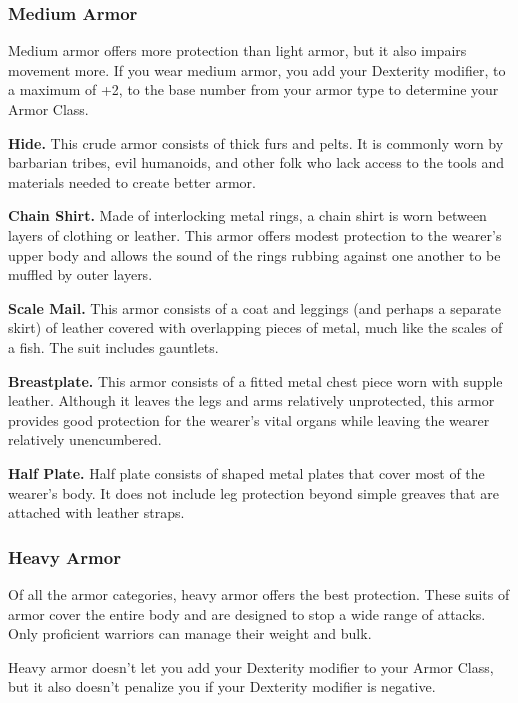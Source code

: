 \documentclass[
]{article}
\begin{document}
\hypertarget{medium-armor}{%
\subsubsection{Medium Armor}\label{medium-armor}}

Medium armor offers more protection than light armor, but it also
impairs movement more. If you wear medium armor, you add your Dexterity
modifier, to a maximum of +2, to the base number from your armor type to
determine your Armor Class.

\textbf{Hide.} This crude armor consists of thick furs and pelts. It is
commonly worn by barbarian tribes, evil humanoids, and other folk who
lack access to the tools and materials needed to create better armor.

\textbf{Chain Shirt.} Made of interlocking metal rings, a chain shirt is
worn between layers of clothing or leather. This armor offers modest
protection to the wearer's upper body and allows the sound of the rings
rubbing against one another to be muffled by outer layers.

\textbf{Scale Mail.} This armor consists of a coat and leggings (and
perhaps a separate skirt) of leather covered with overlapping pieces of
metal, much like the scales of a fish. The suit includes gauntlets.

\textbf{Breastplate.} This armor consists of a fitted metal chest piece
worn with supple leather. Although it leaves the legs and arms
relatively unprotected, this armor provides good protection for the
wearer's vital organs while leaving the wearer relatively unencumbered.

\textbf{Half Plate.} Half plate consists of shaped metal plates that
cover most of the wearer's body. It does not include leg protection
beyond simple greaves that are attached with leather straps.

\hypertarget{heavy-armor}{%
\subsubsection{Heavy Armor}\label{heavy-armor}}

Of all the armor categories, heavy armor offers the best protection.
These suits of armor cover the entire body and are designed to stop a
wide range of attacks. Only proficient warriors can manage their weight
and bulk.

Heavy armor doesn't let you add your Dexterity modifier to your Armor
Class, but it also doesn't penalize you if your Dexterity modifier is
negative.
\end{document}
